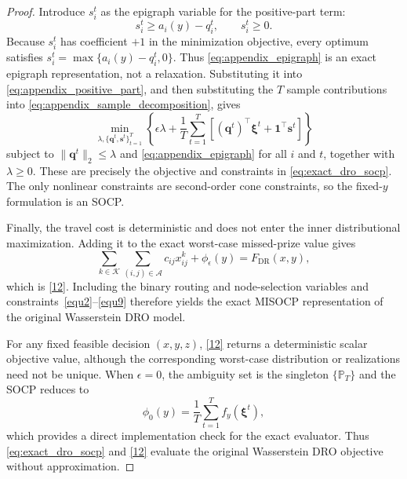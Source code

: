 \documentclass[preprint,12pt,authoryear]{elsarticle}
\theoremstyle{definition}
\begin{document}
\begin{proof}
{Introduce $s_i^t$ as the epigraph variable for the positive-part term:
\begin{equation}
s_i^t\geq a_i(y)-q_i^t,
\qquad
s_i^t\geq0.
\label{eq:appendix_epigraph}
\end{equation}
Because $s_i^t$ has coefficient $+1$ in the minimization objective, every optimum satisfies
$s_i^t=\max\{a_i(y)-q_i^t,0\}$. Thus \eqref{eq:appendix_epigraph} is an exact epigraph representation, not a relaxation. Substituting it into \eqref{eq:appendix_positive_part}, and then substituting the $T$ sample contributions into \eqref{eq:appendix_sample_decomposition}, gives
\begin{equation}
\min_{\lambda,\{\boldsymbol{q}^{t},\boldsymbol{s}^{t}\}_{t=1}^{T}}
\left\{
\epsilon\lambda+
\frac{1}{T}\sum_{t=1}^{T}
\left[(\boldsymbol{q}^{t})^\top\boldsymbol{\xi}^t+
\boldsymbol{1}^\top\boldsymbol{s}^{t}\right]
\right\}
\label{eq:appendix_aggregated_objective}
\end{equation}
subject to $\|\boldsymbol{q}^{t}\|_2\leq\lambda$ and \eqref{eq:appendix_epigraph} for all $i$ and $t$, together with $\lambda\geq0$. These are precisely the objective and constraints in \eqref{eq:exact_dro_socp}. The only nonlinear constraints are second-order cone constraints, so the fixed-$y$ formulation is an SOCP.

Finally, the travel cost is deterministic and does not enter the inner distributional maximization. Adding it to the exact worst-case missed-prize value gives
\begin{equation}
\sum_{k\in\mathcal{K}}\sum_{(i,j)\in\mathcal{A}}c_{ij}x_{ij}^k
+\phi_\epsilon(y)
=F_{\mathrm{DR}}(x,y),
\end{equation}
which is \eqref{12}. Including the binary routing and node-selection variables and constraints~\eqref{equ2}--\eqref{equ9} therefore yields the exact MISOCP representation of the original Wasserstein DRO model.


For any fixed feasible decision $(x,y,z)$, \eqref{12} returns a deterministic scalar objective value, although the corresponding worst-case distribution or realizations need not be unique. When $\epsilon=0$, the ambiguity set is the singleton $\{\mathbb{P}_T\}$ and the SOCP reduces to
\begin{equation}
\phi_0(y)=\frac{1}{T}\sum_{t=1}^{T}f_y(\boldsymbol{\xi}^t),
\label{eq:zero_radius_check}
\end{equation}
which provides a direct implementation check for the exact evaluator. Thus \eqref{eq:exact_dro_socp} and \eqref{12} evaluate the original Wasserstein DRO objective without approximation.
}
\end{proof}
\end{document}
